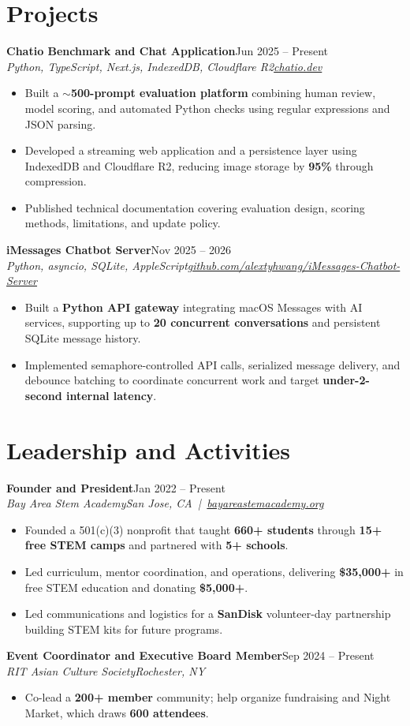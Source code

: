 \documentclass[10pt,letterpaper]{article}
\newif\ifresumeFirstRole
\newcommand{\resumeRole}[4]{\ifresumeFirstRole\global\resumeFirstRolefalse\else\vspace{0pt plus 1fill}\fi\textbf{#1}\hfill #2\\\textit{#3}\hfill\textit{#4}}
\begin{document}
\section*{Projects}
\resumeRole{Chatio Benchmark and Chat Application}{Jun 2025 -- Present}{Python, TypeScript, Next.js, IndexedDB, Cloudflare R2}{\href{https://chatio.dev}{chatio.dev}}
\begin{itemize}
\item Built a \textbf{${\sim}$500-prompt evaluation platform} combining human review, model scoring, and automated Python checks using regular expressions and JSON parsing.
\item Developed a streaming web application and a persistence layer using IndexedDB and Cloudflare R2, reducing image storage by \textbf{95\%} through compression.
\item Published technical documentation covering evaluation design, scoring methods, limitations, and update policy.
\end{itemize}
\resumeRole{iMessages Chatbot Server}{Nov 2025 -- 2026}{Python, asyncio, SQLite, AppleScript}{\href{https://github.com/alextyhwang/iMessages-Chatbot-Server}{github.com/alextyhwang/iMessages-Chatbot-Server}}
\begin{itemize}
\item Built a \textbf{Python API gateway} integrating macOS Messages with AI services, supporting up to \textbf{20 concurrent conversations} and persistent SQLite message history.
\item Implemented semaphore-controlled API calls, serialized message delivery, and debounce batching to coordinate concurrent work and target \textbf{under-2-second internal latency}.
\end{itemize}
\section*{Leadership and Activities}
\resumeRole{Founder and President}{Jan 2022 -- Present}{Bay Area Stem Academy}{San Jose, CA \,|\, \href{https://bayareastemacademy.org}{bayareastemacademy.org}}
\begin{itemize}
\item Founded a 501(c)(3) nonprofit that taught \textbf{660+ students} through \textbf{15+ free STEM camps} and partnered with \textbf{5+ schools}.
\item Led curriculum, mentor coordination, and operations, delivering \textbf{\$35,000+} in free STEM education and donating \textbf{\$5,000+}.
\item Led communications and logistics for a \textbf{SanDisk} volunteer-day partnership building STEM kits for future programs.
\end{itemize}
\resumeRole{Event Coordinator and Executive Board Member}{Sep 2024 -- Present}{RIT Asian Culture Society}{Rochester, NY}
\begin{itemize}
\item Co-lead a \textbf{200+ member} community; help organize fundraising and Night Market, which draws \textbf{600 attendees}.
\end{itemize}
\end{document}
